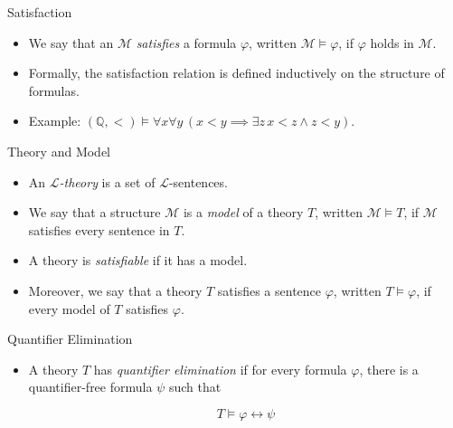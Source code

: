 \documentclass[aspectratio=169,11pt]{beamer}
\begin{document}
\begin{frame}{Satisfaction}
  \begin{itemize}
    \item We say that an $\mathcal{M}$ \textit{satisfies} a formula $\varphi$, written $\mathcal{M} \models \varphi$, if $\varphi$ holds in $\mathcal{M}$.
    \item Formally, the satisfaction relation is defined inductively on the structure of formulas.
    \item Example: \((\mathbb{Q}, <) \models \forall x \forall y\, (x<y \implies \exists z\, x < z \wedge z < y)\).
  \end{itemize}
\end{frame}

\begin{frame}{Theory and Model}
  \begin{itemize}
    \item An \textit{$\mathcal{L}$-theory} is a set of $\mathcal{L}$-sentences.
    \item We say that a structure $\mathcal{M}$ is a \textit{model} of a theory $T$, written $\mathcal{M} \models T$, if $\mathcal{M}$ satisfies every sentence in $T$.
    \item A theory is \textit{satisfiable} if it has a model.
    \item Moreover, we say that a theory $T$ satisfies a sentence $\varphi$, written $T \models \varphi$, if every model of $T$ satisfies $\varphi$.
  \end{itemize}
\end{frame}

\begin{frame}{Quantifier Elimination}
  \begin{itemize}
    \item A theory $T$ has \textit{quantifier elimination} if for every formula $\varphi$, there is a quantifier-free formula $\psi$ such that

    \[
    T \models \varphi \leftrightarrow \psi
    \]
  \end{itemize}
\end{frame}
\end{document}
